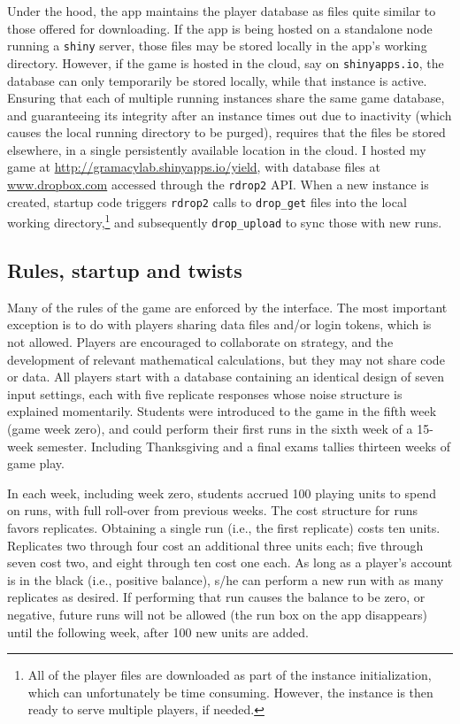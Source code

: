 \documentclass[12pt]{article}
\begin{document}
Under the hood, the app maintains the player database as files quite
similar to those offered for downloading.  If the app is being hosted on a
standalone node running a {\tt shiny} server, those files may be stored
locally in the app's working directory.  However, if the game is hosted in the
cloud, say on
\verb!shinyapps.io!, the database can only temporarily be stored locally,
while that instance is active. Ensuring that each of multiple running
instances share the same game database,  and guaranteeing its integrity after
an instance times out due to inactivity (which causes the local running
directory to be purged), requires that the files be stored elsewhere, in a
single persistently available location in the cloud. I hosted my game at
\url{http://gramacylab.shinyapps.io/yield}, with database files at
\url{www.dropbox.com} accessed through the {\tt rdrop2} \citep{rdrop2} API.
When a new instance is created, startup code triggers {\tt rdrop2} calls to
\verb!drop_get! files into the local working directory,\footnote{All of the
player files are downloaded as part of the instance initialization, which can
unfortunately be time consuming. However, the instance is then ready to serve
multiple players, if needed.} and subsequently \verb!drop_upload! to sync
those with new runs.

\subsection{Rules, startup and twists}
\label{sec:rules}

Many of the rules of the game are enforced by the interface.  The most
important exception is to do with players sharing data files and/or login
tokens, which is not allowed. Players are encouraged to collaborate on
strategy, and the development of relevant mathematical calculations, but they
may not share code or data.  All players start with a database containing an
identical design of seven input settings, each with five replicate responses
whose noise structure is explained momentarily.  Students were introduced to
the game in the fifth week (game week zero), and could perform their first
runs in the sixth week of a 15-week semester. Including Thanksgiving and a
final exams tallies thirteen weeks of game play.

In each week, including week zero, students accrued 100 playing units to spend
on runs, with full roll-over from previous weeks.  The cost structure for runs
favors replicates.  Obtaining a single run (i.e., the first replicate) costs
ten units.  Replicates two through four cost an additional three units each; five
through seven cost two, and eight through ten cost one each.  As long as a player's
account is in the black (i.e., positive balance), s/he can perform a new run
with as many replicates as desired.  If performing that run causes the balance
to be zero, or negative, future runs will not be allowed (the run box on the
app disappears) until the following week, after 100 new units are added.
\end{document}
